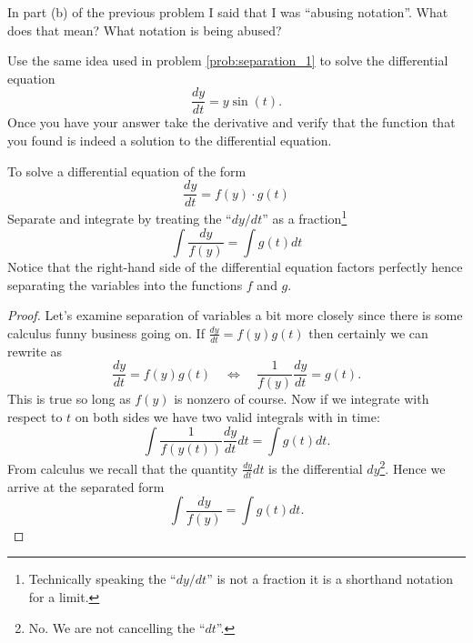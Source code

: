 \begin{problem}
    In part (b) of the previous problem I said that I was ``abusing notation''.  What does
    that mean?  What notation is being abused?
\end{problem}

\begin{problem}
    Use the same idea used in problem \ref{prob:separation_1} to solve the differential
    equation 
    \[ \frac{dy}{dt} = y\sin(t). \]
    Once you have your answer take the derivative and verify that the function that you
    found is indeed a solution to the differential equation.
\end{problem}

\begin{thm}
    To solve a differential equation of the form
    \[ \frac{dy}{dt} = f(y)\cdot g(t) \]
    Separate and integrate by treating the ``$dy/dt$'' as a fraction\footnote{Technically
        speaking the ``$dy/dt$'' is not a fraction it is a shorthand notation for a
    limit.}
    \[ \int \frac{dy}{f(y)} = \int g(t) dt \]
    Notice that the right-hand side of the differential equation factors perfectly hence
    separating the variables into the functions $f$ and $g$.
\end{thm}
\begin{proof}
Let's examine separation of variables a bit more closely since there is some calculus
funny business going on.  If $\frac{dy}{dt} = f(y) g(t)$ then  certainly we can rewrite as
\[ \frac{dy}{dt} = f(y) g(t) \quad \iff \quad \frac{1}{f(y)} \frac{dy}{dt} = g(t). \]
This is true so long as $f(y)$ is nonzero of course.  Now if we integrate with respect to
$t$ on both sides we have two valid integrals with in time:
\[ \int \frac{1}{f(y(t))} \frac{dy}{dt} dt = \int g(t) dt. \]
From calculus we recall that the quantity $\frac{dy}{dt} dt$ is the differential
$dy$\footnote{No. We are not cancelling the ``$dt$''.}.  Hence we arrive at the separated
form
\[ \int \frac{dy}{f(y)} = \int g(t) dt. \]
\end{proof}


